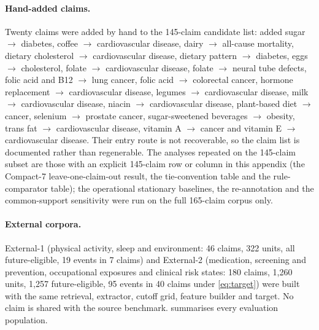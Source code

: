 \documentclass[11pt]{article}
\newcommand{\compact}{Compact-7\xspace}
\begin{document}
\paragraph{Hand-added claims.} Twenty claims were added by hand to the 145-claim candidate list:
added sugar $\rightarrow$ diabetes, coffee $\rightarrow$ cardiovascular disease, dairy $\rightarrow$
all-cause mortality, dietary cholesterol $\rightarrow$ cardiovascular disease, dietary pattern
$\rightarrow$ diabetes, eggs $\rightarrow$ cholesterol, folate $\rightarrow$ cardiovascular disease,
folate $\rightarrow$ neural tube defects, folic acid and B12 $\rightarrow$ lung cancer, folic acid
$\rightarrow$ colorectal cancer, hormone replacement $\rightarrow$ cardiovascular disease, legumes
$\rightarrow$ cardiovascular disease, milk $\rightarrow$ cardiovascular disease, niacin $\rightarrow$
cardiovascular disease, plant-based diet $\rightarrow$ cancer, selenium $\rightarrow$ prostate
cancer, sugar-sweetened beverages $\rightarrow$ obesity, trans fat $\rightarrow$ cardiovascular
disease, vitamin A $\rightarrow$ cancer and vitamin E $\rightarrow$ cardiovascular disease. Their
entry route is not recoverable, so the claim list is documented rather than regenerable. The analyses repeated on the 145-claim subset are those with an explicit 145-claim row or column in this appendix (the \compact leave-one-claim-out result, the tie-convention table and the rule-comparator table); the operational stationary baselines, the re-annotation and the common-support sensitivity were run on the full 165-claim corpus only.

\paragraph{External corpora.} External-1 (physical activity, sleep and environment: 46 claims, 322
units, all future-eligible, 19 events in 7 claims) and External-2 (medication, screening and
prevention, occupational exposures and clinical risk states: 180 claims, 1{,}260 units, 1{,}257
future-eligible, 95 events in 40 claims under \cref{eq:target}) were built with the same
retrieval, extractor, cutoff grid, feature builder and target. No claim is shared with the source
benchmark.  summarises every evaluation population.
\end{document}

